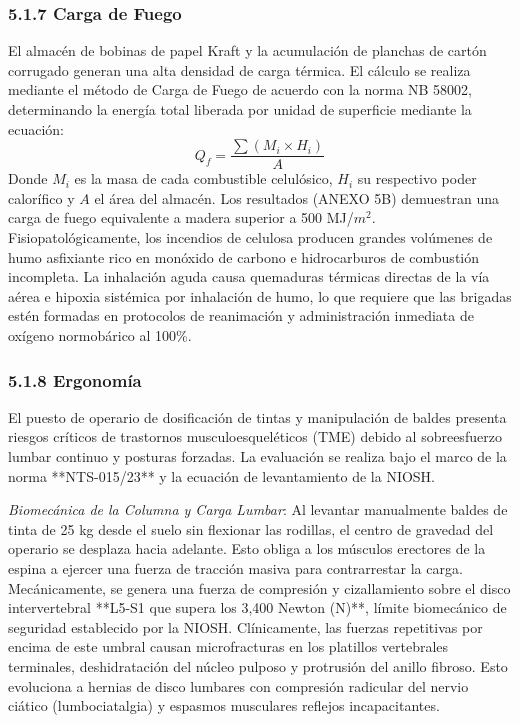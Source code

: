 \documentclass[11pt, letterpaper]{article}
\begin{document}
\subsubsection{5.1.7 Carga de Fuego}
El almacén de bobinas de papel Kraft y la acumulación de planchas de cartón corrugado generan una alta densidad de carga térmica. El cálculo se realiza mediante el método de Carga de Fuego de acuerdo con la norma NB 58002, determinando la energía total liberada por unidad de superficie mediante la ecuación:
\begin{equation}
    Q_f = \frac{\sum (M_i \times H_i)}{A}
\end{equation}
Donde $M_i$ es la masa de cada combustible celulósico, $H_i$ su respectivo poder calorífico y $A$ el área del almacén. Los resultados (ANEXO 5B) demuestran una carga de fuego equivalente a madera superior a 500 MJ/$m^2$. Fisiopatológicamente, los incendios de celulosa producen grandes volúmenes de humo asfixiante rico en monóxido de carbono e hidrocarburos de combustión incompleta. La inhalación aguda causa quemaduras térmicas directas de la vía aérea e hipoxia sistémica por inhalación de humo, lo que requiere que las brigadas estén formadas en protocolos de reanimación y administración inmediata de oxígeno normobárico al 100\%.

\subsubsection{5.1.8 Ergonomía}
El puesto de operario de dosificación de tintas y manipulación de baldes presenta riesgos críticos de trastornos musculoesqueléticos (TME) debido al sobreesfuerzo lumbar continuo y posturas forzadas. La evaluación se realiza bajo el marco de la norma **NTS-015/23** y la ecuación de levantamiento de la NIOSH.

\textit{Biomecánica de la Columna y Carga Lumbar}: Al levantar manualmente baldes de tinta de 25 kg desde el suelo sin flexionar las rodillas, el centro de gravedad del operario se desplaza hacia adelante. Esto obliga a los músculos erectores de la espina a ejercer una fuerza de tracción masiva para contrarrestar la carga. Mecánicamente, se genera una fuerza de compresión y cizallamiento sobre el disco intervertebral **L5-S1 que supera los 3,400 Newton (N)**, límite biomecánico de seguridad establecido por la NIOSH. Clínicamente, las fuerzas repetitivas por encima de este umbral causan microfracturas en los platillos vertebrales terminales, deshidratación del núcleo pulposo y protrusión del anillo fibroso. Esto evoluciona a hernias de disco lumbares con compresión radicular del nervio ciático (lumbociatalgia) y espasmos musculares reflejos incapacitantes.
\end{document}
